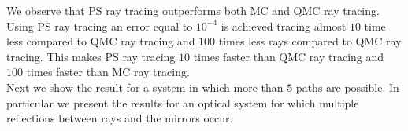 We observe that PS ray tracing outperforms both MC and QMC ray tracing. 
Using PS ray tracing an error equal to $10^{-4}$ is achieved tracing almost $10$ time less compared to QMC ray tracing and $100$ times less rays compared to QMC ray tracing. This makes PS ray tracing $10$ times faster than QMC ray tracing and $100$ times faster than MC ray tracing.\\ \indent Next we show the result for a system in which more than $5$ paths are possible. 
In particular we present the results for an optical system for which multiple reflections between rays and the mirrors occur.
